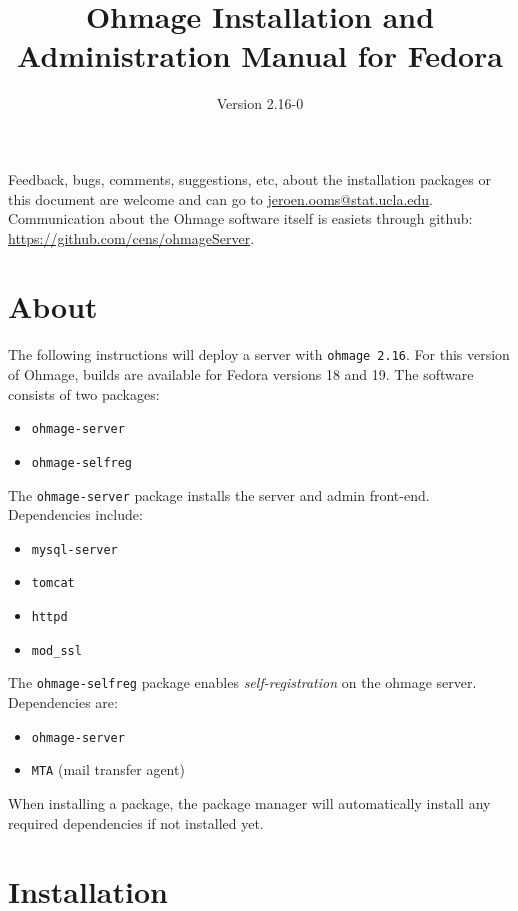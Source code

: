 \documentclass{scrartcl}
\title{Ohmage Installation and Administration Manual for Fedora}
\subtitle{Version 2.16-0}
\begin{document}
\maketitle

\noindent Feedback, bugs, comments, suggestions, etc, about the installation
packages or this document are welcome and can go to \href{mailto:jeroen.ooms@stat.ucla.edu}{jeroen.ooms@stat.ucla.edu}.
Communication about the Ohmage software itself is easiets through github:
\href{https://github.com/cens/ohmageServer}{https://github.com/cens/ohmageServer}.

\section*{About}

\noindent The following instructions will deploy a server with \texttt{ohmage
2.16}. For this version of Ohmage, builds are available for Fedora versions 18
and 19.
The software consists of two packages:

\begin{itemize}
  \item \texttt{ohmage-server}
  \item \texttt{ohmage-selfreg} 
\end{itemize}

\noindent The \texttt{ohmage-server} package installs the server and
admin front-end. Dependencies include:

\begin{itemize}
  \item \texttt{mysql-server}
  \item \texttt{tomcat}
  \item \texttt{httpd}
  \item \texttt{mod\_ssl}
\end{itemize}

\noindent The \texttt{ohmage-selfreg} package enables \emph{self-registration}
on the ohmage server. Dependencies are:

\begin{itemize}
  \item \texttt{ohmage-server}
  \item \texttt{MTA} (mail transfer agent)
\end{itemize}

\noindent When installing a package, the package manager will automatically
install any required dependencies if not installed yet.


\section{Installation}
\end{document}
